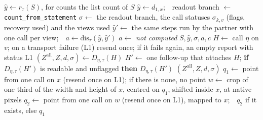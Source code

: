 \begin{algorithm*}[t]
\begin{algorithmic}[1]
  \State $\hat y\gets r_\tau(S)$, for counts the list count of $S$ 
    \State $\hat y\gets d_{1,x}$;\ \ readout branch $\gets$ \texttt{count\_from\_statement}
  \EndIf
  \State $\sigma\gets$ the readout branch, the call statuses $\sigma_{k,v}$ (flags, recovery used) and the views used
\EndIf
{} 
  \State $\hat y'\gets$ the same steps run by the partner with one call per view;\ \ $a\gets\mathrm{dis}_\tau(\hat y,\hat y')$
\Else
  \State $a\gets$ \emph{not computed}
\EndIf
\State \Return $S,\hat y,\sigma,a,c$
\Statex
{} 
  \State $H\gets$ call $\eta$ on $v$; on a transport failure (L1) resend once; if it fails again, \Return an empty report with status L1
  \State $(Z^{\mathrm{all}},Z,d,\sigma)\gets D_{\eta,\tau}(H)$ 
    \State $H'\gets$ one follow-up that attaches $H$; \textbf{if} $D_{\eta,\tau}(H')$ is readable and unflagged \textbf{then} \Return $D_{\eta,\tau}(H')$
  \EndIf
  \State \Return $(Z^{\mathrm{all}},Z,d,\sigma)$
\EndFunction
\Statex
{} 
  \State $q_1\gets$ point from one call on $x$ (resend once on L1); if there is none, \Return no point
  \State $w\gets$ crop of one third of the width and height of $x$, centred on $q_1$, shifted inside $x$, at native pixels
  \State $q_2\gets$ point from one call on $w$ (resend once on L1), mapped to $x$;\ \ \Return $q_2$ if it exists, else $q_1$
\EndFunction
\end{algorithmic}
\end{algorithm*}

